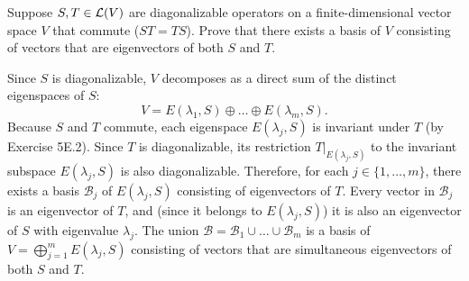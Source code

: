 \begin{xrcs}
  Suppose $S, T \in \mathcal{L}(V)$ are diagonalizable operators on a finite-dimensional vector space $V$ that commute ($ST = TS$). Prove that there exists a basis of $V$ consisting of vectors that are eigenvectors of both $S$ and $T$.
\begin{xprf}
  Since $S$ is diagonalizable, $V$ decomposes as a direct sum of the distinct eigenspaces of $S$:
  \[
    V = E(\lambda_1, S) \oplus \dots \oplus E(\lambda_m, S).
  \]
  Because $S$ and $T$ commute, each eigenspace $E(\lambda_j, S)$ is invariant under $T$ (by Exercise 5E.2).
  Since $T$ is diagonalizable, its restriction $T|_{E(\lambda_j, S)}$ to the invariant subspace $E(\lambda_j, S)$ is also diagonalizable.
  Therefore, for each $j \in \{1, \dots, m\}$, there exists a basis $\mathcal{B}_j$ of $E(\lambda_j, S)$ consisting of eigenvectors of $T$.
  Every vector in $\mathcal{B}_j$ is an eigenvector of $T$, and (since it belongs to $E(\lambda_j, S)$) it is also an eigenvector of $S$ with eigenvalue $\lambda_j$.
  The union $\mathcal{B} = \mathcal{B}_1 \cup \dots \cup \mathcal{B}_m$ is a basis of $V = \bigoplus_{j=1}^m E(\lambda_j, S)$ consisting of vectors that are simultaneous eigenvectors of both $S$ and $T$.
\end{xprf}
\end{xrcs}